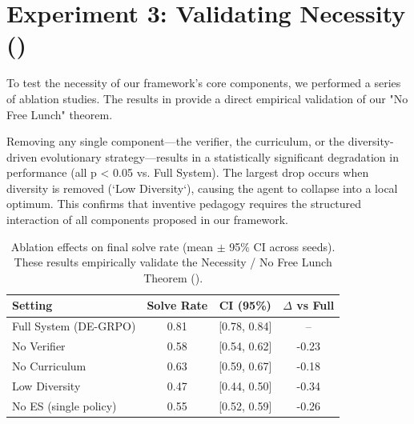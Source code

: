 \section{Experiment 3: Validating Necessity ()}
To test the necessity of our framework's core components, we performed a series of ablation studies. The results in  provide a direct empirical validation of our "No Free Lunch" theorem.

Removing any single component—the verifier, the curriculum, or the diversity-driven evolutionary strategy—results in a statistically significant degradation in performance (all p < 0.05 vs. Full System). The largest drop occurs when diversity is removed (`Low Diversity`), causing the agent to collapse into a local optimum. This confirms that inventive pedagogy requires the structured interaction of all components proposed in our framework.

\begin{table}[htbp]
    \centering
    \caption{Ablation effects on final solve rate (mean $\pm$ 95\% CI across seeds). These results empirically validate the Necessity / No Free Lunch Theorem ().}
    \label{tab:ablations}
    \begin{tabular}{@{}lccc@{}}
        \toprule
        \textbf{Setting} & \textbf{Solve Rate} & \textbf{CI (95\%)} & \textbf{$\Delta$ vs Full} \\
        \midrule
        Full System (DE-GRPO) & 0.81 & [0.78, 0.84] & -- \\
        \addlinespace
        No Verifier & 0.58 & [0.54, 0.62] & -0.23 \\
        No Curriculum & 0.63 & [0.59, 0.67] & -0.18 \\
        Low Diversity & 0.47 & [0.44, 0.50] & -0.34 \\
        No ES (single policy) & 0.55 & [0.52, 0.59] & -0.26 \\
        \bottomrule
    \end{tabular}
\end{table}